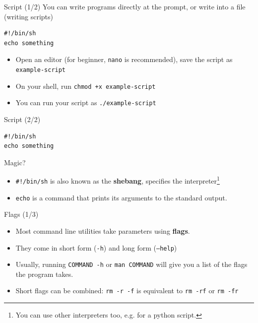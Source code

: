 \documentclass[12pt]{beamer}
\begin{document}
\begin{frame}[fragile]{Script (1/2)}
  You can write programs directly at the prompt, or write into a file (writing scripts)
  \begin{verbatim}
#!/bin/sh
echo something
\end{verbatim}
  \begin{itemize}
    \item Open an editor (for beginner, \texttt{nano} is recommended), save the script as \texttt{example-script}
    \item On your shell, run \texttt{chmod +x example-script}
    \item You can run your script as \texttt{./example-script}
  \end{itemize}
\end{frame}

\begin{frame}[fragile]{Script (2/2)}
  \begin{verbatim}
#!/bin/sh
echo something
\end{verbatim}
  Magic?
  \begin{itemize}
    \newsavebox\mybox
    \begin{lrbox}{\mybox}
      {\scriptsize\texttt{#!/usr/bin/env python}}
    \end{lrbox}
    \item \texttt{#!/bin/sh} is also known as the \textbf{shebang}, specifies the interpreter\footnote{You can use other interpreters too, e.g. \footnotesize\usebox{\mybox} for a python script.}
    \item \texttt{echo} is a command that prints its arguments to the standard output.
  \end{itemize}
\end{frame}

\begin{frame}[fragile]{Flags (1/3)}
  \begin{itemize}
    \item Most command line utilities take parameters using \textbf{flags}.
    \item They come in short form (\texttt{-h}) and long form (\texttt{--help})
    \item Usually, running \texttt{COMMAND -h} or \texttt{man COMMAND} will give you a list of the flags the program takes.
    \item Short flags can be combined: \texttt{rm -r -f} is equivalent to \texttt{rm -rf} or \texttt{rm -fr}
  \end{itemize}
\end{frame}
\end{document}
